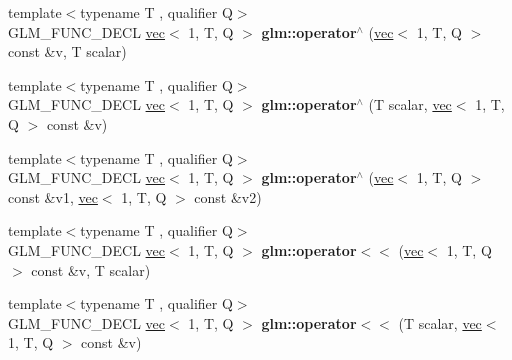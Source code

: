 \begin{DoxyCompactItemize}
\item 
\mbox{\label{group__ext__vec1_ga5e3dabaa97accd1e6cf3853326605d3e}} 
{\footnotesize template$<$typename T , qualifier Q$>$ }\\G\+L\+M\+\_\+\+F\+U\+N\+C\+\_\+\+D\+E\+CL \hyperlink{structglm_1_1vec}{vec}$<$ 1, T, Q $>$ {\bfseries glm\+::operator$^\wedge$} (\hyperlink{structglm_1_1vec}{vec}$<$ 1, T, Q $>$ const \&v, T scalar)
\item 
\mbox{\label{group__ext__vec1_gad8d8f5ba70c15af0a21dc1f79c2101b9}} 
{\footnotesize template$<$typename T , qualifier Q$>$ }\\G\+L\+M\+\_\+\+F\+U\+N\+C\+\_\+\+D\+E\+CL \hyperlink{structglm_1_1vec}{vec}$<$ 1, T, Q $>$ {\bfseries glm\+::operator$^\wedge$} (T scalar, \hyperlink{structglm_1_1vec}{vec}$<$ 1, T, Q $>$ const \&v)
\item 
\mbox{\label{group__ext__vec1_gaf70fee42d06c335b281793ffc5864b3e}} 
{\footnotesize template$<$typename T , qualifier Q$>$ }\\G\+L\+M\+\_\+\+F\+U\+N\+C\+\_\+\+D\+E\+CL \hyperlink{structglm_1_1vec}{vec}$<$ 1, T, Q $>$ {\bfseries glm\+::operator$^\wedge$} (\hyperlink{structglm_1_1vec}{vec}$<$ 1, T, Q $>$ const \&v1, \hyperlink{structglm_1_1vec}{vec}$<$ 1, T, Q $>$ const \&v2)
\item 
\mbox{\label{group__ext__vec1_gad0e63491d035c65d38f24bd45d2e19d3}} 
{\footnotesize template$<$typename T , qualifier Q$>$ }\\G\+L\+M\+\_\+\+F\+U\+N\+C\+\_\+\+D\+E\+CL \hyperlink{structglm_1_1vec}{vec}$<$ 1, T, Q $>$ {\bfseries glm\+::operator$<$$<$} (\hyperlink{structglm_1_1vec}{vec}$<$ 1, T, Q $>$ const \&v, T scalar)
\item 
\mbox{\label{group__ext__vec1_gad8117a2c6f59f08e76561309bcdffd1a}} 
{\footnotesize template$<$typename T , qualifier Q$>$ }\\G\+L\+M\+\_\+\+F\+U\+N\+C\+\_\+\+D\+E\+CL \hyperlink{structglm_1_1vec}{vec}$<$ 1, T, Q $>$ {\bfseries glm\+::operator$<$$<$} (T scalar, \hyperlink{structglm_1_1vec}{vec}$<$ 1, T, Q $>$ const \&v)
\item 
\mbox{\label{group__ext__vec1_gad8eac20444d6f266c9b23a6a05e75a5a}} 

\end{DoxyCompactItemize}
